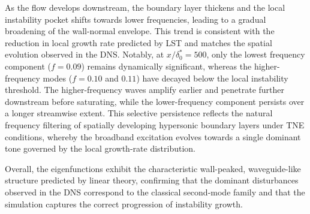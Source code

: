 As the flow develops downstream, the boundary layer thickens and the local instability pocket shifts towards lower frequencies, leading to a gradual broadening of the wall-normal envelope. This trend is consistent with the reduction in local growth rate predicted by \gls{LST} and matches the spatial evolution observed in the \gls{DNS}. Notably, at $x/\delta^{*}_{0} = 500$, only the lowest frequency component ($f = 0.09$) remains dynamically significant, whereas the higher-frequency modes ($f = 0.10$ and $0.11$) have decayed below the local instability threshold. The higher-frequency waves amplify earlier and penetrate further downstream before saturating, while the lower-frequency component persists over a longer streamwise extent. This selective persistence reflects the natural frequency filtering of spatially developing hypersonic boundary layers under \gls{TNE} conditions, whereby the broadband excitation evolves towards a single dominant tone governed by the local growth-rate distribution.

Overall, the eigenfunctions exhibit the characteristic wall-peaked, waveguide-like structure predicted by linear theory, confirming that the dominant disturbances observed in the \gls{DNS} correspond to the classical second-mode family and that the simulation captures the correct progression of instability growth.

